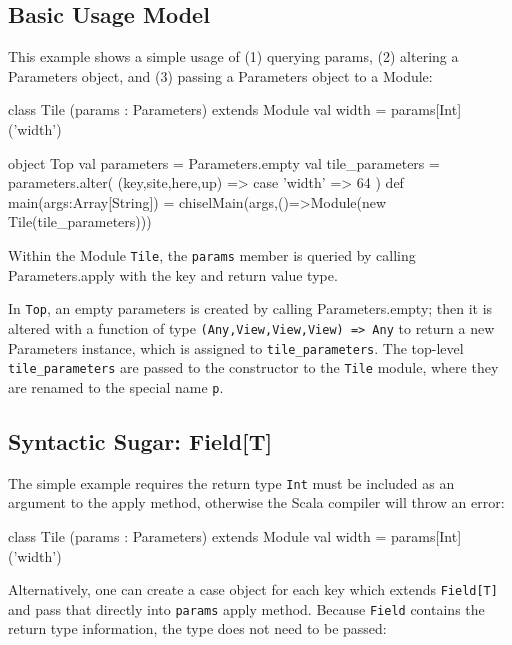\documentclass[10pt,twocolumn]{article}
\def\code#1{{\small\tt #1}}
\begin{document}
\subsection{Basic Usage Model}

This example shows a simple usage of (1) querying params, (2) altering a Parameters object, and (3) passing a Parameters object to a Module:

\begin{scala}
class Tile (params : Parameters) extends Module { 
  val width = params[Int]('width') 
}

object Top {
  val parameters = Parameters.empty
  val tile_parameters = parameters.alter( (key,site,here,up) => {
    case 'width' => 64
  })
  def main(args:Array[String]) = {
    chiselMain(args,()=>Module(new Tile(tile_parameters)))
  }
}
\end{scala}

Within the Module \code{Tile}, the \code{params} member is queried by calling Parameters.apply with the
key and return value type.

In \code{Top}, an empty parameters is created by calling
Parameters.empty; then it is altered with a function of type
\code{(Any,View,View,View) => Any} to return a new Parameters
instance, which is assigned to \code{tile\_parameters}. The top-level
\code{tile\_parameters} are passed to the constructor to the
\code{Tile} module, where they are renamed to the special name
\code{p}. 


\subsection{Syntactic Sugar: Field[T]}

The simple example requires the return type \code{Int} must be included as an argument to the apply method, otherwise the Scala compiler will throw an error:

\begin{scala}
class Tile (params : Parameters) extends Module { 
  val width = params[Int]('width') 
}
\end{scala}

Alternatively, one can create a case object for each key which extends \code{Field[T]} and pass that directly into \code{params} apply method. Because \code{Field} contains the return type information, the type does not need to be passed:
\end{document}
